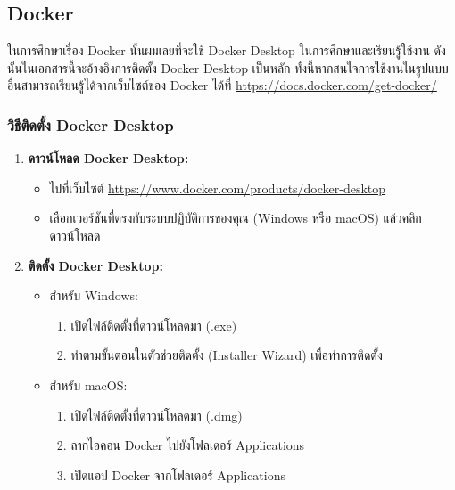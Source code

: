\subsection{Docker}
ในการศึกษาเรื่อง Docker \cite{docker} นั้นผมเลยที่จะใช้ Docker Desktop ในการศึกษาและเรียนรู้ใช้งาน
ดังนั้นในเอกสารนี้จะอ้างอิงการติดตั้ง Docker Desktop เป็นหลัก ทั้งนี้หากสนใจการใช้งานในรูปแบบอื่นสามารถเรียนรู้ได้จากเว็บไซต์ของ Docker ได้ที่ \url{https://docs.docker.com/get-docker/}
\subsubsection{วิธีติดตั้ง Docker Desktop}
\begin{enumerate}
      \item \textbf{ดาวน์โหลด Docker Desktop:}
            \begin{itemize}
                  \item ไปที่เว็บไซต์ \url{https://www.docker.com/products/docker-desktop}
                  \item เลือกเวอร์ชันที่ตรงกับระบบปฏิบัติการของคุณ (Windows หรือ macOS) แล้วคลิกดาวน์โหลด
            \end{itemize}

      \item \textbf{ติดตั้ง Docker Desktop:}
            \begin{itemize}
                  \item สำหรับ Windows:
                        \begin{enumerate}
                              \item เปิดไฟล์ติดตั้งที่ดาวน์โหลดมา (.exe)
                              \item ทำตามขั้นตอนในตัวช่วยติดตั้ง (Installer Wizard) เพื่อทำการติดตั้ง
                        \end{enumerate}
                  \item สำหรับ macOS:
                        \begin{enumerate}
                              \item เปิดไฟล์ติดตั้งที่ดาวน์โหลดมา (.dmg)
                              \item ลากไอคอน Docker ไปยังโฟลเดอร์ Applications
                              \item เปิดแอป Docker จากโฟลเดอร์ Applications
                        \end{enumerate}
            \end{itemize}


\end{enumerate}
